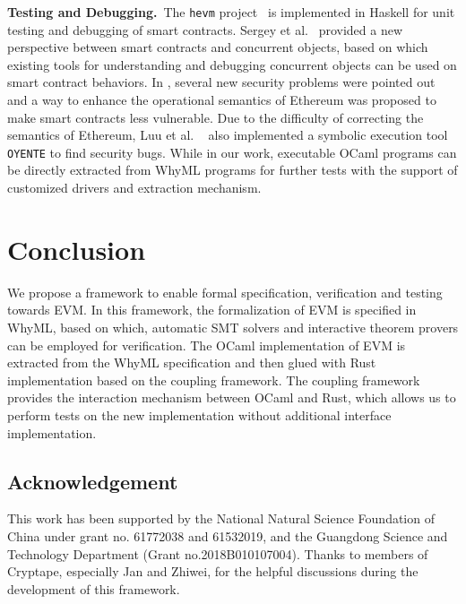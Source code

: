 \documentclass[runningheads]{llncs}
\begin{document}
\noindent\textbf{Testing and Debugging.}~The \texttt{hevm} project~\cite{hevm} is implemented in Haskell for unit testing and debugging of smart contracts.
Sergey et al.~\cite{sergey2017concurrent} provided a new perspective between smart contracts and concurrent objects,
based on which existing tools for understanding and
debugging concurrent objects can be used on smart contract behaviors. 
In \cite{luu2016making}, several new security problems were pointed out and a way to enhance the operational semantics of 
Ethereum was proposed to make smart contracts less vulnerable. 
Due to the difficulty of correcting the semantics of Ethereum, Luu et al.
~\cite{luu2016making} also implemented a symbolic execution tool \texttt{OYENTE} to find security bugs.
While in our work, executable OCaml programs can be directly extracted from WhyML programs for further tests 
with the support of customized drivers and extraction mechanism.
 

\section{Conclusion}\label{Sec: Conclusion}
We propose a framework to enable formal specification, verification and testing towards EVM. 
In this framework, the formalization of EVM is specified in WhyML, 
based on which, automatic SMT solvers and interactive theorem provers can be employed for verification. 
The OCaml implementation of EVM is extracted from the WhyML specification and then glued with Rust implementation based on the coupling framework. The coupling framework provides the interaction mechanism between OCaml and Rust, which allows us to perform tests on the new implementation without additional interface implementation.

\subsection*{Acknowledgement}
\noindent This work has been supported by the National Natural Science Foundation of China under grant no. 61772038 and 61532019, and the Guangdong Science and Technology Department (Grant no.2018B010107004). Thanks to members of Cryptape, especially Jan and Zhiwei, for the helpful discussions during the development of this framework.




\end{document}
